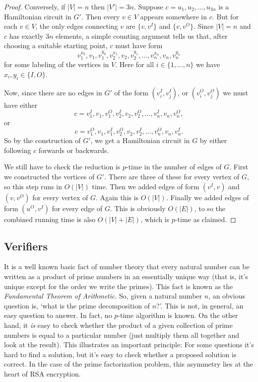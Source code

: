 \documentclass{article}
\theoremstyle{plain}
\theoremstyle{definition}
\begin{document}
\begin{proof}
Conversely, if $|V|=n$ then $|V'|=3n$. Suppose $c=u_1,u_2,\ldots,u_{3n}$ is a Hamiltonian circuit in $G'$. Then every $v\in V$ appears somewhere in $c$. But for each $v\in V$, the only edges connecting $v$ are $\{v,v^I\}$ and $\{v,v^O\}$. Since $|V|=n$ and $c$ has exactly $3n$ elements, a simple counting argument tells us that, after choosing a suitable starting point, $c$ must have form \[v^{x_0}_1,v_1, v^{y_0}_1, v_2^{x_1}, v_2, v_2^{y_1},\ldots,v_n^{x_n},v_n,v_n^{y_n}\] for some labeling of the vertices in $V$. Here for all $i\in\{1,\ldots,n\}$ we have $x_i,y_i\in\{I,O\}$.

Now, since there are no edges in $G'$ of the form $(v_i^I,v_j^I)$, or $(v_i^O,v_j^O)$ we must have either  \begin{equation*}c= v^I_1,v_1, v^O_1, v_2^I, v_2, v_2^O,\ldots,v_n^I,v_n,v_n^O,\end{equation*} or \begin{equation*}c=v^O_1,v_1, v^I_1, v_2^O, v_2, v_2^I,\ldots,v_n^O,v_n,v_n^I.\end{equation*} So by the construction of $G'$, we get a Hamiltonian circuit in $G$ by either following $c$ forwards or backwards.

We still have to check the reduction is $p$-time in the number of edges of $G$. First we constructed the vertices of $G'$. There are three of these for every vertex of $G$, so this step runs in $O(|V|)$ time. Then we added edges of form $(v^I,v)$ and $(v,v^O)$ for every vertex of $G$. Again this is $O(|V|)$. Finally we added edges of form $(u^O,v^I)$ for every edge of $G$. This is obviously $O(|E|)$, to so the combined running time is also $O(|V|+|E|)$, which is $p$-time as claimed.
\end{proof}

\subsection{Verifiers}
It is a well known basic fact of number theory that every natural number can be written as a product of prime numbers in an essentially unique way (that is, it's unique except for the order we write the primes). This fact is known as the \emph{Fundamental Theorem of Arithmetic}. So, given a natural number $n$, an obvious question is, `what is the prime decomposition of $n$?'. This is not, in general, an easy question to answer. In fact, no $p$-time algorithm is known. On the other hand, it \emph{is} easy to check whether the product of a given collection of prime numbers is equal to a particular number (just multiply them all together and look at the result). This illustrates an important principle: For some questions it's hard to find a solution, but it's easy to check whether a proposed solution is correct. In the case of the prime factorization problem, this asymmetry lies at the heart of RSA encryption.
\end{document}
